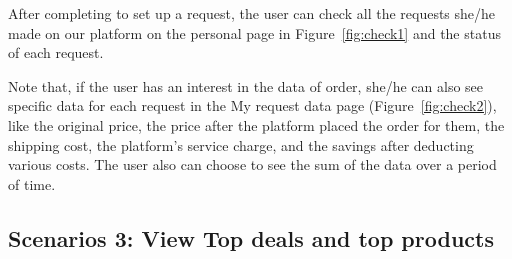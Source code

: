After completing to set up a request, the user can check all the requests she/he made on our platform on the personal page in Figure~\ref{fig:check1} and the status of each request.

Note that, if the user has an interest in the data of order, she/he can also see specific data for each request in the My request data page (Figure~\ref{fig:check2}), like the original price, the price after the platform placed the order for them, the shipping cost, the platform's service charge, and the savings after deducting various costs. The user also can choose to see the sum of the data over a period of time.

\subsection{Scenarios 3: View Top deals and top products}

